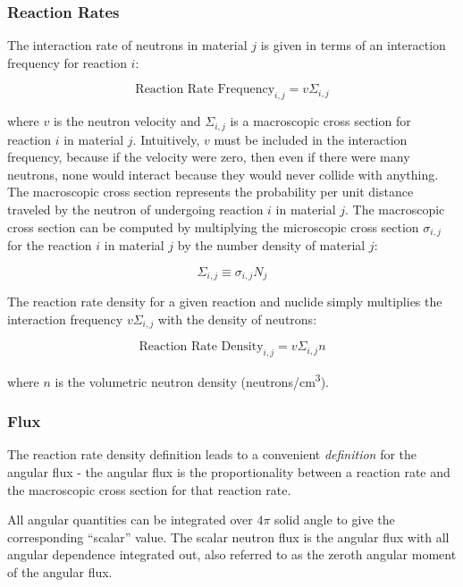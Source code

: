 \documentclass[10pt]{article}
\newcommand{\beq}{\begin{equation}}
\newcommand{\eeq}{\end{equation}}
\begin{document}
\begin{flushleft}
\subsubsection{Reaction Rates}

The interaction rate of neutrons in material \(j\) is given in terms of an interaction frequency for reaction \(i\):

\begin{equation}
\label{eq:ReactionFrequency}
\textrm{Reaction Rate Frequency}_{i, j} = v\Sigma_{i, j}
\end{equation}

where \(v\) is the neutron velocity and \(\Sigma_{i, j}\) is a macroscopic cross section for reaction \(i\) in material \(j\). Intuitively, \(v\) must be included in the interaction frequency, because if the velocity were zero, then even if there were many neutrons, none would interact because they would never collide with anything. The macroscopic cross section represents the probability per unit distance traveled by the neutron of undergoing reaction \(i\) in material \(j\). The macroscopic cross section can be computed by multiplying the microscopic cross section \(\sigma_{i,j}\) for the reaction \(i\) in material \(j\) by the number density of material \(j\):

\beq
\Sigma_{i,j}\equiv\sigma_{i,j}N_j
\eeq

The reaction rate density for a given reaction and nuclide simply multiplies the interaction frequency \(v\Sigma_{i,j}\) with the density of neutrons:

\beq
\label{eq:ReactionRateDensity}
\textrm{Reaction Rate Density}_{i,j} = v\Sigma_{i,j}n
\eeq

where \(n\) is the volumetric neutron density (neutrons/cm\textsuperscript{3}). 

\subsubsection{Flux}

The reaction rate density definition leads to a convenient \textit{definition} for the angular flux - the angular flux is the proportionality between a reaction rate and the macroscopic cross section for that reaction rate.


All angular quantities can be integrated over \(4\pi\) solid angle to give the corresponding ``scalar'' value. The scalar neutron flux is the angular flux with all angular dependence integrated out, also referred to as the zeroth angular moment of the angular flux.


\end{flushleft}
\end{document}
